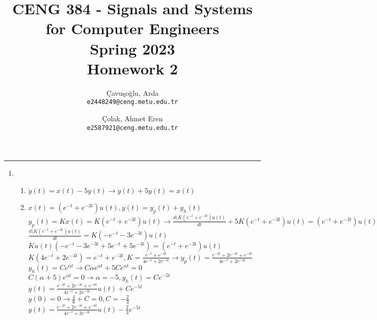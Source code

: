 \documentclass[10pt,a4paper, margin=1in]{article}
\author{
  Çavuşoğlu, Arda\\
  \texttt{e2448249@ceng.metu.edu.tr}
  \and
  Çolak, Ahmet Eren\\
  \texttt{e2587921@ceng.metu.edu.tr}
}
\title{CENG 384 - Signals and Systems for Computer Engineers \\
Spring 2023 \\
Homework 2}
\begin{document}
\maketitle



\noindent\rule{19cm}{1.2pt}

\begin{enumerate}

\item %
    \begin{enumerate}
    \item %
    $\Dot{y}(t) = x(t) - 5y(t) \longrightarrow \Dot{y}(t) + 5y(t) = x(t)$ \vspace{0.3cm}
    \item %
    $x(t) = (e^{-t} + e^{-3t})u(t), y(t) = y_p(t) + y_h(t)$ \vspace{0.2cm}\\
    $y_p(t) = Kx(t) = K(e^{-t} + e^{-3t})u(t) \longrightarrow \frac{d(K(e^{-t} + e^{-3t})u(t)}{dt} + 5K(e^{-t} + e^{-3t})u(t) = (e^{-t} + e^{-3t})u(t)$ \vspace{0.1cm}\\
    $\frac{d(K(e^{-t} + e^{-3t})u(t)}{dt} = K(-e^{-t}-3e^{-3t})u(t)$ \vspace{0.1cm} \\
    $Ku(t)(-e^{-t}-3e^{-3t}+5e^{-t}+5e^{-3t}) = (e^{-t} + e^{-3t})u(t)$ \vspace{0.1cm} \\
    $K(4e^{-t}+2e^{-3t}) = e^{-t} + e^{-3t}, K = \frac{e^{-t}+e^{-3t}}{4e^{-t}+2e^{-3t}} \longrightarrow y_p(t) = \frac{e^{-2t}+2e^{-4t}+e^{-6t}}{4e^{-t}+2e^{-3t}}$ \vspace{0.2cm} \\

    $y_h(t) = Ce^{\alpha t} \longrightarrow C\alpha e^{\alpha t} + 5Ce^{\alpha t} = 0$ \vspace{0.1cm} \\
    $C(\alpha + 5)e^{\alpha t} = 0 \longrightarrow \alpha = -5, y_h(t) = Ce^{-5t}$ \vspace{0.2cm} \\

    $y(t) = \frac{e^{-2t}+2e^{-4t}+e^{-6t}}{4e^{-t}+2e^{-3t}}u(t) + Ce^{-5t}$ \vspace{0.1cm} \\
    $y(0) = 0 \longrightarrow \frac{4}{6} + C = 0, C = -\frac{2}{3}$ \vspace{0.1cm} \\
    $y(t) =  \frac{e^{-2t}+2e^{-4t}+e^{-6t}}{4e^{-t}+2e^{-3t}}u(t)-\frac{2}{3}e^{-5t}$ \vspace{0.3cm}\\
    \end{enumerate}


\end{enumerate}
\end{document}
